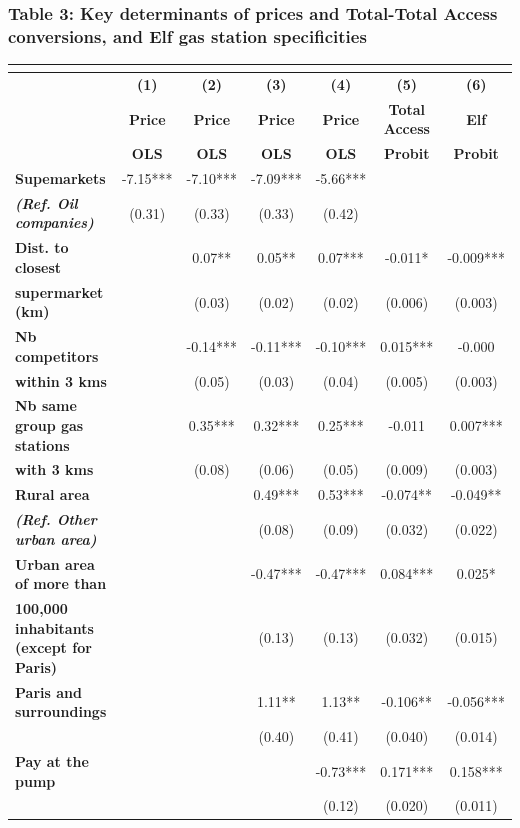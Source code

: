 \documentclass[english]{article}
\begin{document}
\subsubsection*{Table 3: Key determinants of prices and Total-Total Access conversions, and Elf gas station specificities}

\begin{center}
\begin{footnotesize} %
\begin{tabular}{l|cccccc}
\multicolumn{1}{l}{} &  &  &  &  &  & \tabularnewline
\hline
\hline
 & \textbf{(1)}  & \textbf{(2)}  & \textbf{(3)}  & \textbf{(4)}  & \textbf{(5)}  & \textbf{(6)}\tabularnewline
 & \textbf{Price}  & \textbf{Price}  & \textbf{Price}  & \textbf{Price}  & \textbf{Total Access}  & \textbf{Elf}\tabularnewline
 & \textbf{OLS}  & \textbf{OLS}  & \textbf{OLS}  & \textbf{OLS}  & \textbf{Probit}  & \textbf{Probit}\tabularnewline
\hline
\textbf{Supemarkets}  & -7.15{*}{*}{*}  & -7.10{*}{*}{*}  & -7.09{*}{*}{*}  & -5.66{*}{*}{*}  &  & \tabularnewline
\textbf{\textit{(Ref. Oil companies)}}  & (0.31)  & (0.33)  & (0.33)  & (0.42)  &  & \tabularnewline
\hline
\textbf{Dist. to closest}  &  & 0.07{*}{*}  & 0.05{*}{*}  & 0.07{*}{*}{*}  & -0.011{*}  & -0.009{*}{*}{*}\tabularnewline
\textbf{supermarket (km)}  &  & (0.03)  & (0.02)  & (0.02)  & (0.006)  & (0.003)\tabularnewline
\textbf{Nb competitors}  &  & -0.14{*}{*}{*}  & -0.11{*}{*}{*}  & -0.10{*}{*}{*}  & 0.015{*}{*}{*}  & -0.000\tabularnewline
\textbf{within 3 kms}  &  & (0.05)  & (0.03)  & (0.04)  & (0.005)  & (0.003)\tabularnewline
\textbf{Nb same group gas stations}  &  & 0.35{*}{*}{*}  & 0.32{*}{*}{*}  & 0.25{*}{*}{*}  & -0.011  & 0.007{*}{*}{*}\tabularnewline
\textbf{with 3 kms}  &  & (0.08)  & (0.06)  & (0.05)  & (0.009)  & (0.003)\tabularnewline
\hline
\textbf{Rural area}  &  &  & 0.49{*}{*}{*}  & 0.53{*}{*}{*}  & -0.074{*}{*}  & -0.049{*}{*}\tabularnewline
\textbf{\textit{(Ref. Other urban area)}}  &  &  & (0.08)  & (0.09)  & (0.032)  & (0.022)\tabularnewline
\textbf{Urban area of more than}  &  &  & -0.47{*}{*}{*}  & -0.47{*}{*}{*}  & 0.084{*}{*}{*}  & 0.025{*}\tabularnewline
\textbf{100,000 inhabitants (except for Paris)}  &  &  & (0.13)  & (0.13)  & (0.032)  & (0.015)\tabularnewline
\textbf{Paris and surroundings}  &  &  & 1.11{*}{*}  & 1.13{*}{*}  & -0.106{*}{*}  & -0.056{*}{*}{*}\tabularnewline
 &  &  & (0.40)  & (0.41)  & (0.040)  & (0.014)\tabularnewline
\hline
\textbf{Pay at the pump}  &  &  &  & -0.73{*}{*}{*}  & 0.171{*}{*}{*}  & 0.158{*}{*}{*}\tabularnewline
 &  &  &  & (0.12)  & (0.020)  & (0.011)\tabularnewline

\end{tabular}
\end{footnotesize}
\end{center}
\end{document}
